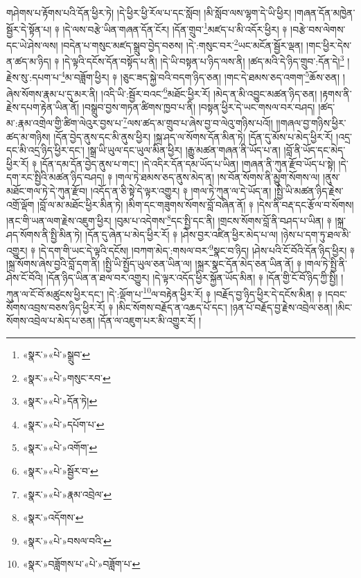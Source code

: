 གཤེགས་པ་རྟོགས་པའི་དོན་ཕྱིར་ཏེ། །དེ་ཕྱིར་ཕྱི་རོལ་པ་དང་སློབ། །མི་སློབ་ལས་ལྷག་དེ་ཡི་ཕྱིར། །གཞན་དོན་མཁྱེན་སྦྱོར་དེ་སྟོན་པ། ༈ །དེ་ལས་བརྩེ་ཡིན་གཞན་དོན་ངོར། །དོན་གྲུབ་\footnote{«སྣར་»«པེ་»སྒྲུབ་}མཛད་པ་མི་འདོར་ཕྱིར། ༈ །བརྩེ་བས་ལེགས་དང་ཡེ་ཤེས་ལས། །བདེན་པ་གསུང་མཛད་སྒྲུབ་བྱེད་བཅས། །དེ་:གསུང་བར་\footnote{«སྣར་»«པེ་»གསུང་རབ་}ཡང་མངོན་སྦྱོར་ལྡན། །གང་ཕྱིར་དེས་ན་ཚད་མ་ཉིད། ༈ །དེ་ལྟའི་དངོས་དོན་བསྟོད་པ་ནི། །དེ་ཡི་བསྟན་པ་ཉིད་ལས་ནི། །ཚད་མའི་དེ་ཉིད་གྲུབ་:དོན་དེ།\footnote{«སྣར་»«པེ་»དོན་ཏེ།} །རྗེས་སུ་:དཔག་པ་\footnote{«སྣར་»«པེ་»དཔོག་པ་}མ་བཟློག་ཕྱིར། ༈ །ཅུང་ཟད་སྐྱེ་བའི་བདག་ཉིད་ཅན། །གང་དེ་ཐམས་ཅད་འགག་\footnote{«སྣར་»«པེ་»འགོག་}ཆོས་ཅན། །ཞེས་སོགས་རྣམ་པ་དུ་མར་ནི། །འདི་ཡི་:སྦྱོར་བའང་\footnote{«སྣར་»«པེ་»སྦྱོར་བ་}མཐོང་ཕྱིར་རོ། །མེད་ན་མི་འབྱུང་མཚན་ཉིད་ཅན། །རྟགས་ནི་རྗེས་དཔག་རྟེན་ཡིན་ནོ། །བསྒྲུབ་བྱས་གཏན་ཚིགས་ཁྱབ་པ་ནི། །བསྟན་ཕྱིར་དེ་ཡང་གསལ་བར་བཤད། །ཚད་མ་:རྣམ་འགྲེལ་གྱི་ཚིག་ལེའུར་བྱས་པ་\footnote{«སྣར་»«པེ་»རྣམ་འབྲེལ་}ལས་ཚད་མ་གྲུབ་པ་ཞེས་བྱ་བ་ལེའུ་གཉིས་པའོ།། །།གཞལ་བྱ་གཉིས་ཕྱིར་ཚད་མ་གཉིས། །དོན་བྱེད་ནུས་དང་མི་ནུས་ཕྱིར། །སྐྲ་ཤད་ལ་སོགས་དོན་མིན་ཏེ། །དོན་དུ་མོས་པ་མེད་ཕྱིར་རོ། །འདྲ་དང་མི་འདྲ་ཉིད་ཕྱིར་དང་། །སྒྲ་ཡི་ཡུལ་དང་ཡུལ་མིན་ཕྱིར། །རྒྱུ་མཚན་གཞན་ནི་ཡོད་པ་ན། །བློ་ནི་ཡོད་དང་མེད་ཕྱིར་རོ། ༈ །དོན་དམ་དོན་བྱེད་ནུས་པ་གང་། །དེ་འདིར་དོན་དམ་ཡོད་པ་ཡིན། །གཞན་ནི་ཀུན་རྫོབ་ཡོད་པ་སྟེ། །དེ་དག་རང་སྤྱིའི་མཚན་ཉིད་བཤད། ༈ །གལ་ཏེ་ཐམས་ཅད་ནུས་མེད་ན། །ས་བོན་སོགས་ནི་མྱུག་སོགས་ལ། །ནུས་མཐོང་གལ་ཏེ་དེ་ཀུན་རྫོབ། །འདོད་ན་ཅི་སྟེ་དེ་ལྟར་འགྱུར། ༈ །གལ་ཏེ་ཀུན་ལ་དེ་ཡོད་ན། །སྤྱི་ཡི་མཚན་ཉིད་རྗེས་འགྲོ་ལྡོག །བློ་ལ་མ་མཐོང་ཕྱིར་མིན་ཏེ། །མིག་དང་གཟུགས་སོགས་བློ་བཞིན་ནོ། ༈ །དེས་ནི་བརྡ་དང་རྩོལ་བ་སོགས། །ནང་གི་ཡན་ལག་རྗེས་འཇུག་ཕྱིར། །བུམ་པ་འདེགས་\footnote{«སྣར་»འདོགས་}དང་སྤྱི་དང་ནི། །གྲངས་སོགས་བློ་ནི་བཤད་པ་ཡིན། ༈ །སྐྲ་ཤད་སོགས་ནི་སྤྱི་མིན་ཏེ། །དོན་དུ་ཞེན་པ་མེད་ཕྱིར་རོ། ༈ །ཤེས་བྱར་འཛིན་ཕྱིར་མེད་པ་ལ། །ཉེས་པ་དག་ཏུ་ཐལ་མི་འགྱུར། ༈ །དེ་དག་གི་ཡང་དེ་ལྟའི་དངོས། །བཀག་མེད་:གསལ་བར་\footnote{«སྣར་»«པེ་»བསལ་བའི་}སྣང་བ་ཉིད། །ཤེས་པའི་ངོ་བོའི་དོན་ཉིད་ཕྱིར། ༈ །སྐྲ་སོགས་ཞེས་བྱའི་བློ་དག་ནི། །སྤྱི་ཡི་སྤྱོད་ཡུལ་ཅན་ཡིན་ལ། །སྐྲར་སྣང་དོན་མེད་ཅན་ཡིན་ནོ། ༈ །གལ་ཏེ་སྤྱི་ནི་ཤེས་ངོ་བོའི། །དོན་ཉིད་ཡིན་ན་ཐལ་བར་འགྱུར། །དེ་ལྟར་འདོད་ཕྱིར་སྐྱོན་ཡོད་མིན། ༈ །དོན་གྱི་ངོ་བོ་ཉིད་ཀྱི་སྤྱི། །ཀུན་ལ་ངོ་བོ་མཚུངས་ཕྱིར་དང་། །དེ་:ལྡོག་པ་\footnote{«སྣར་»བཟློགས་པ་«པེ་»བཟློག་པ་}ལ་བརྟེན་ཕྱིར་རོ། ༈ །བརྗོད་བྱ་ཉིད་ཕྱིར་དེ་དངོས་མིན། ༈ །དབང་སོགས་འབྲས་བཅས་ཉིད་ཕྱིར་རོ། ༈ །མིང་སོགས་བརྗོད་ན་འཆད་པོ་དང་། །ཉན་པོ་བརྗོད་བྱ་རྗེས་འབྲེལ་ཅན། །མིང་སོགས་འབྲེལ་པ་མེད་པ་ཅན། །དོན་ལ་འཇུག་པར་མི་འགྱུར་རོ། །
